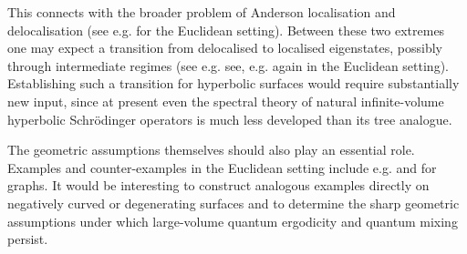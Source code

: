 \documentclass[11pt,twoside,reqno]{amsart}
\newcommand{\1}{\mathrm{\mathbf{1}}}
\numberwithin{equation}{section}
\theoremstyle{plain}
\theoremstyle{definition}
\theoremstyle{remark}
\begin{document}
This connects with the broader problem of Anderson localisation and delocalisation (see e.g. \cite{Klein1998,AizenmanWarzel2015,ErdosSalmhoferYau2007,Ueberschar2023,RudnickUeberschar2012,HezariRiviere2017,KurlbergUeberschar2017,KurlbergUeberschar2014} for the Euclidean setting). Between these two extremes one may expect a transition from delocalised to localised eigenstates, possibly through intermediate regimes (see e.g. see, e.g. \cite{Ueberschar2025,KeatingUeberschar2022,ueberschaer2023multifractalityintermediatequantumsystems} again in the Euclidean setting). Establishing such a transition for hyperbolic surfaces would require substantially new input, since at present even the spectral theory of natural infinite-volume hyperbolic Schr\"odinger operators is much less developed than its tree analogue. 

The geometric assumptions themselves should also play an essential role. Examples and counter-examples in the Euclidean setting include e.g. \cite{Hippi, HippiMikkelsen2026} and \cite{McKenzie2022} for graphs. It would be interesting to construct analogous examples directly on negatively curved or degenerating surfaces and to determine the sharp geometric assumptions under which large-volume quantum ergodicity and quantum mixing persist.
\end{document}
